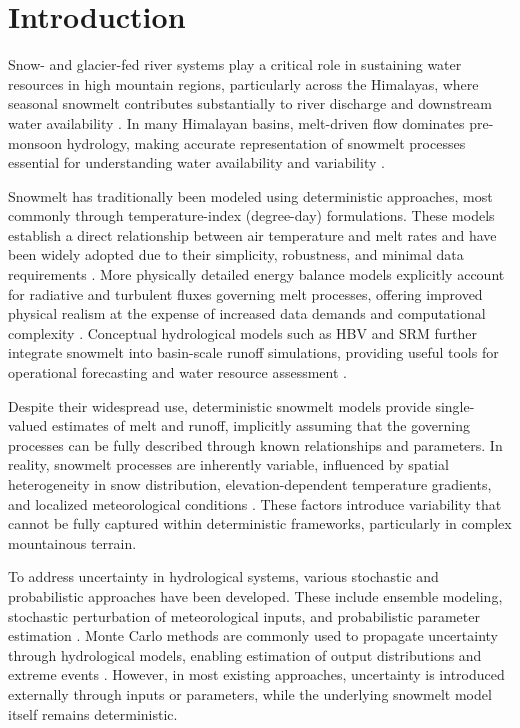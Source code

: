 \documentclass[11pt]{article}
\begin{document}
\section{Introduction}

Snow- and glacier-fed river systems play a critical role in sustaining water resources in high mountain regions, particularly across the Himalayas, where seasonal snowmelt contributes substantially to river discharge and downstream water availability \citep{Bookhagen2010, Immerzeel2010}. In many Himalayan basins, melt-driven flow dominates pre-monsoon hydrology, making accurate representation of snowmelt processes essential for understanding water availability and variability \citep{Singh2002, Barnett2005}.

Snowmelt has traditionally been modeled using deterministic approaches, most commonly through temperature-index (degree-day) formulations. These models establish a direct relationship between air temperature and melt rates and have been widely adopted due to their simplicity, robustness, and minimal data requirements \citep{Hock2003, Ohmura2001, Rango1995}. More physically detailed energy balance models explicitly account for radiative and turbulent fluxes governing melt processes, offering improved physical realism at the expense of increased data demands and computational complexity \citep{Marks1999, Essery2013}. Conceptual hydrological models such as HBV and SRM further integrate snowmelt into basin-scale runoff simulations, providing useful tools for operational forecasting and water resource assessment \citep{Bergstrom1976, Lindstrom1997, Martinec2008}.

Despite their widespread use, deterministic snowmelt models provide single-valued estimates of melt and runoff, implicitly assuming that the governing processes can be fully described through known relationships and parameters. In reality, snowmelt processes are inherently variable, influenced by spatial heterogeneity in snow distribution, elevation-dependent temperature gradients, and localized meteorological conditions \citep{Dozier2011, Essery2013}. These factors introduce variability that cannot be fully captured within deterministic frameworks, particularly in complex mountainous terrain.

To address uncertainty in hydrological systems, various stochastic and probabilistic approaches have been developed. These include ensemble modeling, stochastic perturbation of meteorological inputs, and probabilistic parameter estimation \citep{Montanari2007, Beven2001}. Monte Carlo methods are commonly used to propagate uncertainty through hydrological models, enabling estimation of output distributions and extreme events \citep{Koutsoyiannis2003, Robert2004}. However, in most existing approaches, uncertainty is introduced externally through inputs or parameters, while the underlying snowmelt model itself remains deterministic.
\end{document}
